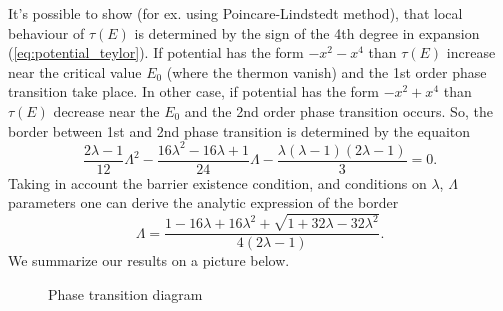 \documentclass[aps, pre, preprint, groupedaddress, superscriptaddress, showkeys, showpacs] {revtex4-1}
\begin{document}
It's possible to show (for ex. using Poincare-Lindstedt method), that local behaviour of $\tau(E)$ is determined by the sign of the 4th degree in expansion (\ref{eq:potential_teylor}).
If potential has the form $-x^2 - x^4$ than $\tau(E)$ increase near the critical value $E_0$ (where the thermon vanish) and the 1st order phase transition take place.
In other case, if potential has the form $-x^2 + x^4$ than $\tau(E)$ decrease near the $E_0$ and the 2nd order phase transition occurs.
So, the border between 1st and 2nd phase transition is determined by the equaiton
%
\begin{equation}
\frac{2\lambda - 1}{12} \Lambda^2 - \frac{16\lambda^2 - 16\lambda + 1}{24} \Lambda - \frac{\lambda (\lambda - 1) (2\lambda - 1)}{3} = 0.
\end{equation}
%
Taking in account the barrier existence condition, and conditions on $\lambda$, $\Lambda$ parameters one can derive the analytic expression of the border
%
\begin{equation}
\Lambda = \frac{1 - 16\lambda + 16\lambda^2 + \sqrt{1 + 32\lambda - 32\lambda^2}}{4(2\lambda - 1)}.
\label{eq:order_border}
\end{equation}
%
We summarize our results on a picture below.
%
\begin{figure}[ht]
\caption{Phase transition diagram}
\end{figure}
%
\end{document}
